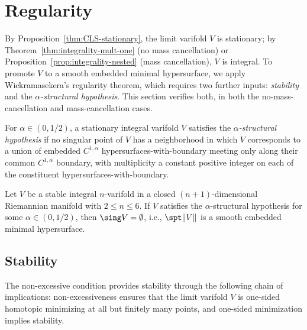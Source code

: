 
\section{Regularity}\label{sec:regularity}

By Proposition~\ref{thm:CLS-stationary}, the limit varifold $V$ is stationary; by Theorem~\ref{thm:integrality-mult-one} (no mass cancellation) or Proposition~\ref{prop:integrality-nested} (mass cancellation), $V$ is integral. To promote $V$ to a smooth embedded minimal hypersurface, we apply Wickramasekera's regularity theorem, which requires two further inputs: \emph{stability} and the \emph{$\alpha$-structural hypothesis}. This section verifies both, in both the no-mass-cancellation and mass-cancellation cases.

\begin{definition}\label{defn:alpha-structural}
For $\alpha \in (0, 1/2)$, a stationary integral varifold $V$ satisfies the \emph{$\alpha$-structural hypothesis} if no singular point
of $V$ has a neighborhood in which $V$ corresponds to a union of embedded $C^{1,\alpha}$ hypersurfaces-with-boundary
meeting only along their common $C^{1,\alpha}$ boundary, with multiplicity a constant positive integer
on each of the constituent hypersurfaces-with-boundary.
\end{definition}

\begin{theorem}\label{thm:wickramasekera}
    Let $V$ be a stable integral $n$-varifold in a closed $(n+1)$-dimensional Riemannian manifold
    with $2\leq n\leq 6$. If $V$ satisfies the $\alpha$-structural hypothesis for some $\alpha \in (0, 1/2)$,
    then $\sing V = \emptyset$, i.e., $\spt\|V\|$ is a smooth embedded minimal hypersurface.
\end{theorem}

\subsection{Stability}\label{subsec:stability}

The non-excessive condition provides stability through the following chain of implications: non-excessiveness ensures that the limit varifold $V$ is one-sided homotopic minimizing at all but finitely many points, and one-sided minimization implies stability.

